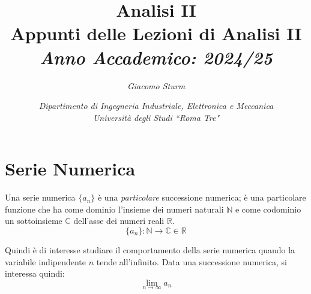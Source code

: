 \documentclass{article}
\numberwithin{equation}{subsection}
\begin{document}
\title{%
    \textbf{Analisi II}  \\ 
    \large Appunti delle Lezioni di Analisi II \\
    \textit{Anno Accademico: 2024/25}}
\author{\textit{Giacomo Sturm}}
\date{\textit{Dipartimento di Ingegneria Industriale, Elettronica e Meccanica \\
Università degli Studi ``Roma Tre"}} 

\maketitle
\thispagestyle{link}

\clearpage


\pagestyle{fancy}
\fancyhead{}\fancyfoot{}
\fancyfoot[C]{\thepage}

\tableofcontents

\clearpage
{}

\section{Serie Numerica}


Una serie numerica $\{a_n\}$ è una \textit{particolare} successione numerica; 
è una particolare funzione che ha come dominio l'insieme dei numeri naturali $\mathbb{N}$ e come codominio un sottoinsieme $\mathbb{C}$ dell'asse dei numeri reali $\mathbb{R}$. 
\begin{equation}
    \{a_n\}:\mathbb{N}\rightarrow\mathbb{C}\in\mathbb{R}
\end{equation}

Quindi è di interesse studiare il comportamento della serie numerica quando la variabile indipendente $n$ tende all'infinito. Data una successione numerica, si interessa quindi:
\begin{equation}
    \lim_{n\to\infty}a_n
\end{equation}
\end{document}
